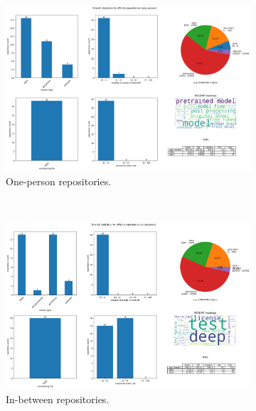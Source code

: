 \documentclass[10pt,a4paper]{scrartcl}
\begin{document}
\begin{figure}[h]
    \centering
    \begin{subfigure}[t]{0.8\textwidth}
        \centering
        \includegraphics[width=\textwidth]{../analysis/overall/overall_one_person.png}
        \caption{One-person repositories.}
        \label{fig:overall_op}
    \end{subfigure}\\
    \begin{subfigure}[t]{0.8\textwidth}
        \centering
        \includegraphics[width=\textwidth]{../analysis/overall/overall_in_between.png}
        \caption{In-between repositories.}
        \label{fig:overall_ib}
    \end{subfigure}\\
    \begin{subfigure}[t]{0.8\textwidth}
        \centering

\end{subfigure}
\end{figure}
\end{document}
